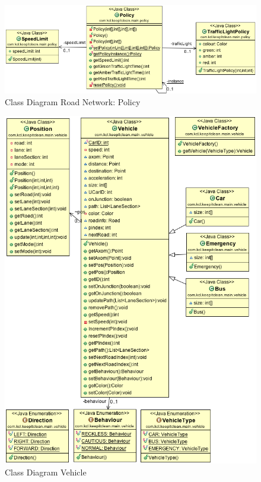 \documentclass[11pt]{article}
\begin{document}
\begin{enumerate}
\begin{figure}[H]
        \includegraphics[width=12cm]{policy} 
        \centering
        \caption{Class Diagram Road Network: Policy} 
        \label{cdpolicy}
\end{figure}

\begin{figure}[H]
        \includegraphics[width=14cm]{vehicle} 
        \centering
        \caption{Class Diagram Vehicle} 
        \label{cdvehicle}
\end{figure}


\end{enumerate}
\end{document}
